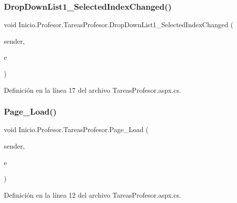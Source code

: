 \subsubsection{\texorpdfstring{DropDownList1\_SelectedIndexChanged()}{DropDownList1\_SelectedIndexChanged()}}
{\footnotesize\ttfamily void Inicio.\+Profesor.\+Tareas\+Profesor.\+Drop\+Down\+List1\+\_\+\+Selected\+Index\+Changed (\begin{DoxyParamCaption}\item[{object}]{sender,  }\item[{Event\+Args}]{e }\end{DoxyParamCaption})\hspace{0.3cm}{\ttfamily [protected]}}



Definición en la línea 17 del archivo Tareas\+Profesor.\+aspx.\+cs.


\begin{DoxyCode}{0}

\end{DoxyCode}
\mbox{\label{classInicio_1_1Profesor_1_1TareasProfesor_a74d7a919e1c7b78045937de1a091114a}} 
\subsubsection{\texorpdfstring{Page\_Load()}{Page\_Load()}}
{\footnotesize\ttfamily void Inicio.\+Profesor.\+Tareas\+Profesor.\+Page\+\_\+\+Load (\begin{DoxyParamCaption}\item[{object}]{sender,  }\item[{Event\+Args}]{e }\end{DoxyParamCaption})\hspace{0.3cm}{\ttfamily [protected]}}



Definición en la línea 12 del archivo Tareas\+Profesor.\+aspx.\+cs.


\begin{DoxyCode}{0}

\end{DoxyCode}


